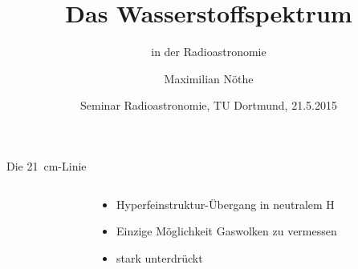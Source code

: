 \documentclass[compress, aspectratio=169]{beamer}
\author{Maximilian Nöthe}
\date[21.5.2015]{Seminar Radioastronomie, TU Dortmund, 21.5.2015}
\title{Das Wasserstoffspektrum}
\subtitle{in der Radioastronomie}
\begin{document}
\maketitle


\begin{frame}{Die \SI{21}{\centi\meter}-Linie}
  \begin{columns}[c]%
    \begin{column}{0.6\textwidth}%
      
    \end{column}%
    \begin{column}{0.4\textwidth}%
      \begin{itemize}
        \item Hyperfeinstruktur-Übergang in neutralem H
        \item Einzige Möglichkeit Gaswolken zu vermessen
        \item stark unterdrückt
      \end{itemize}
    \end{column}%
  \end{columns}%
\end{frame}
\end{document}
